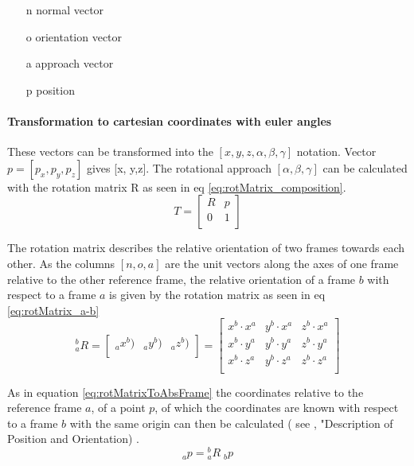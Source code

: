 \begin{itemize}
	\item[n] normal vector
	\item[o] orientation vector
	\item[a] approach vector
	\item[p] position
\end{itemize}
  

\paragraph{Transformation to cartesian coordinates with euler angles }
These vectors can be transformed into the $[x,y,z,\alpha,\beta,\gamma]$ notation.
Vector $p = [p_x, p_y, p_z] $ gives [x, y,z].
The rotational approach $[\alpha, \beta, \gamma]$ can be calculated with the rotation matrix R as seen in eq \ref{eq:rotMatrix_composition}.
\begin{equation}\label{eq:rotMatrix_composition}
	T = 
	\begin{bmatrix}
	R & p \\
	0 & 1 \\
	\end{bmatrix}
\end{equation}

The rotation matrix describes the relative orientation of two frames towards each other. As the columns $[n,o,a]$ are the unit vectors along the axes of one frame relative to the other reference frame, the relative orientation of a frame ${b}$ with respect to a frame ${a}$ is given by the rotation matrix as seen in eq \ref{eq:rotMatrix_a-b} \cite{ConstantinForwardKA}
\begin{equation}
	\phantom{}^b_aR =
	\begin{bmatrix}
	\phantom{}_ax^b) & \phantom{}_ay^b) & \phantom{}_az^b) \\
	\end{bmatrix}
	=
	\begin{bmatrix}
	x^b \cdot x^a & y^b \cdot x^a & z^b \cdot x^a \\
	x^b \cdot y^a & y^b \cdot y^a & z^b \cdot y^a \\
	x^b \cdot z^a & y^b \cdot z^a & z^b \cdot z^a \\
	\end{bmatrix}
\end{equation}

As in equation \ref{eq:rotMatrixToAbsFrame} the coordinates relative to the reference frame ${a}$, of a point $p$, of which the coordinates are known with respect to a frame ${b}$ with the same origin can then be calculated ( see \cite{RobotKinemDyn}, "Description of Position and Orientation) .
\begin{equation}\label{eq:rotMatrixToAbsFrame}
	\phantom{}_a p = \phantom{}^b_aR\phantom{.}_b p 
\end{equation}




